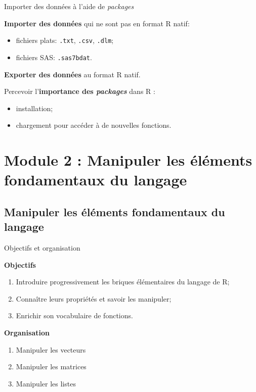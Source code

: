 \documentclass[12pt,ignorenonframetext,]{beamer}
\providecommand{\tightlist}{%
  \setlength{\itemsep}{0pt}\setlength{\parskip}{0pt}}
\newcommand{\strong}[1]{\textbf{\textcolor{redInsee}{#1}}}
\begin{document}
\begin{frame}[fragile]{Importer des données à l'aide de \emph{packages}}

\textbf{Importer des données} qui ne sont pas en format R natif:

\begin{itemize}
\tightlist
\item
  fichiers plats: \texttt{.txt}, \texttt{.csv}, \texttt{.dlm};
\item
  fichiers SAS: \texttt{.sas7bdat}.
\end{itemize}

\bigskip \pause \textbf{Exporter des données} au format R natif.

\bigskip \pause Percevoir l'\textbf{importance des \emph{packages}} dans
R :

\begin{itemize}
\tightlist
\item
  installation;
\item
  chargement pour accéder à de nouvelles fonctions.
\end{itemize}

\end{frame}

\section{Module 2 : Manipuler les éléments fondamentaux du
langage}\label{module-2-manipuler-les-elements-fondamentaux-du-langage}

\subsection*{Manipuler les éléments fondamentaux du
langage}\label{manipuler-les-elements-fondamentaux-du-langage}

\begin{frame}{Objectifs et organisation}

\strong{Objectifs}

\begin{enumerate}
\def\labelenumi{\arabic{enumi}.}
\tightlist
\item
  Introduire progressivement les briques élémentaires du langage de R;
\item
  Connaître leurs propriétés et savoir les manipuler;
\item
  Enrichir son vocabulaire de fonctions.
\end{enumerate}

\bigskip \pause \strong{Organisation}

\begin{enumerate}
\def\labelenumi{\arabic{enumi}.}
\item
  Manipuler les vecteurs
\item
  Manipuler les matrices
\item
  Manipuler les listes
\end{enumerate}

\end{frame}
\end{document}

